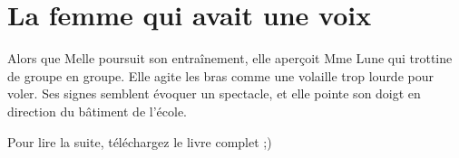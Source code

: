 \thispagestyle{empty}

\chapter{La femme qui avait une voix}

Alors que Melle poursuit son entraînement, elle aperçoit Mme Lune qui trottine de groupe en groupe. Elle agite les bras comme une volaille trop lourde pour voler. Ses signes semblent évoquer un spectacle, et elle pointe son doigt en direction du bâtiment de l'école.

\parbr

Pour lire la suite, téléchargez le livre complet ;) 